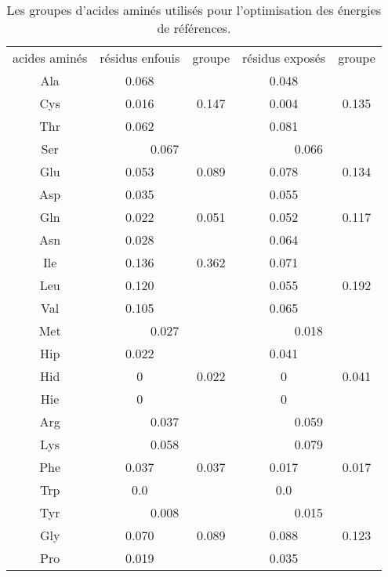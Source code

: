     \begin{table}[!htbp]
      \centering

      \begin{tabular}{c|cc|cc}

        \toprule
        acides aminés & résidus enfouis & groupe & résidus exposés & groupe\\
        \cmidrule{1-5}

        Ala &         0.068 &       &   0.048   \\
        Cys &         0.016 &  0.147  &   0.004 & 0.135  \\    
        Thr &         0.062 &        &   0.081   \\
        \cmidrule{1-5}
        Ser &        \multicolumn{2}{c|}{0.067}     &   \multicolumn{2}{c}{0.066}  \\
        \cmidrule{1-5}
        Glu &         0.053 & 0.089        &   0.078 & 0.134 \\
        Asp &         0.035 &    &   0.055   \\
        \cmidrule{1-5}
        Gln &         0.022 & 0.051 &   0.052 & 0.117\\
        Asn &         0.028 &         &   0.064   \\
        \cmidrule{1-5}
        Ile &         0.136 & 0.362        &   0.071  \\
        Leu &         0.120 &   &   0.055 & 0.192 \\
        Val &         0.105 &         &   0.065  \\
        \cmidrule{1-5}
        Met &    \multicolumn{2}{c|}{0.027}      &  \multicolumn{2}{c}{0.018} \\
        \cmidrule{1-5}
        Hip &         0.022 &      &   0.041 \\
        Hid &         0     &  0.022 &   0    & 0.041\\
        Hie &         0     &        &   0     \\
        \cmidrule{1-5}
        Arg &        \multicolumn{2}{c|}{0.037}      &  \multicolumn{2}{c}{0.059}\\
        \cmidrule{1-5}
        Lys &        \multicolumn{2}{c|}{0.058}         &  \multicolumn{2}{c}{0.079} \\
        \cmidrule{1-5}
        Phe &         0.037 &  0.037  &   0.017 & 0.017 \\
        Trp &         0.0   &        &   0.0  \\
        \cmidrule{1-5}
        Tyr &       \multicolumn{2}{c|}{0.008}      &  \multicolumn{2}{c}{0.015}\\
        \cmidrule{1-5}
        Gly &         0.070  & 0.089 &   0.088 & 0.123\\
        Pro &         0.019  &        &   0.035  \\
        \bottomrule


      \end{tabular}      
      \caption{Les groupes d'acides aminés utilisés pour l'optimisation des énergies de références.}
\label{tab:AA_groupes}      
    \end{table}




